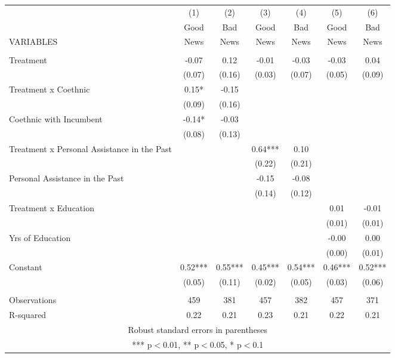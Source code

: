 \begin{tabular}{lcccccc} \hline
 & (1) & (2) & (3) & (4) & (5) & (6) \\
 & Good & Bad & Good & Bad & Good & Bad \\
VARIABLES & News & News & News & News & News & News \\ \hline
 &  &  &  &  &  &  \\
Treatment & -0.07 & 0.12 & -0.01 & -0.03 & -0.03 & 0.04 \\
 & (0.07) & (0.16) & (0.03) & (0.07) & (0.05) & (0.09) \\
Treatment x Coethnic & 0.15* & -0.15 &  &  &  &  \\
 & (0.09) & (0.16) &  &  &  &  \\
Coethnic with Incumbent & -0.14* & -0.03 &  &  &  &  \\
 & (0.08) & (0.13) &  &  &  &  \\
Treatment x Personal Assistance in the Past &  &  & 0.64*** & 0.10 &  &  \\
 &  &  & (0.22) & (0.21) &  &  \\
Personal Assistance in the Past &  &  & -0.15 & -0.08 &  &  \\
 &  &  & (0.14) & (0.12) &  &  \\
Treatment x Education &  &  &  &  & 0.01 & -0.01 \\
 &  &  &  &  & (0.01) & (0.01) \\
Yrs of Education &  &  &  &  & -0.00 & 0.00 \\
 &  &  &  &  & (0.00) & (0.01) \\
Constant & 0.52*** & 0.55*** & 0.45*** & 0.54*** & 0.46*** & 0.52*** \\
 & (0.05) & (0.11) & (0.02) & (0.05) & (0.03) & (0.06) \\
 &  &  &  &  &  &  \\
Observations & 459 & 381 & 457 & 382 & 457 & 371 \\
 R-squared & 0.22 & 0.21 & 0.23 & 0.21 & 0.22 & 0.21 \\ \hline
\multicolumn{7}{c}{ Robust standard errors in parentheses} \\
\multicolumn{7}{c}{ *** p$<$0.01, ** p$<$0.05, * p$<$0.1} \\
\end{tabular}
